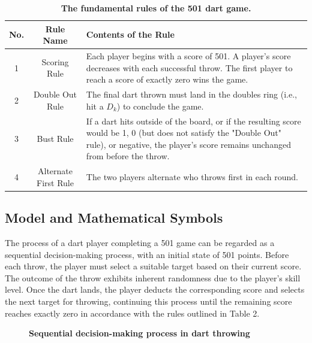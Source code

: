 \documentclass[cjjs]{ipart}
\theoremstyle{plain}
\begin{document}
\begin{table}[h]
    \centering
    \begin{tabular}{|c|c|p{10cm}|}
        \hline
        No. & Rule Name & Contents of the Rule \\
        \hline
        1 & Scoring Rule & Each player begins with a score of 501. A player's score decreases with each successful throw. The first player to reach a score of exactly zero wins the game. \\
        \hline
        2 & Double Out Rule & The final dart thrown must land in the doubles ring (i.e., hit a \( D_k \)) to conclude the game. \\
        \hline
        3 & Bust Rule & If a dart hits outside of the board, or if the resulting score would be 1, 0 (but does not satisfy the "Double Out" rule), or negative, the player's score remains unchanged from before the throw. \\
        \hline
        4 & Alternate First Rule & The two players alternate who throws first in each round. \\
        \hline
     \end{tabular}
     \caption{\textbf{The fundamental rules of the 501 dart game.}}
     \label{tab:rules}
\end{table}


\subsection{Model and Mathematical Symbols}
The process of a dart player completing a 501 game can be regarded as a sequential decision-making process, with an initial state of 501 points. Before each throw, the player must select a suitable target based on their current score. The outcome of the throw exhibits inherent randomness due to the player's skill level. Once the dart lands, the player deducts the corresponding score and selects the next target for throwing, continuing this process until the remaining score reaches exactly zero in accordance with the rules outlined in Table 2.

\begin{figure}[h]
\centering
\begin{minipage}{0.45\textwidth}
    \centering
    \caption{\textbf{Sequential decision-making process in dart throwing}}
\end{minipage}
\end{figure}
\end{document}
